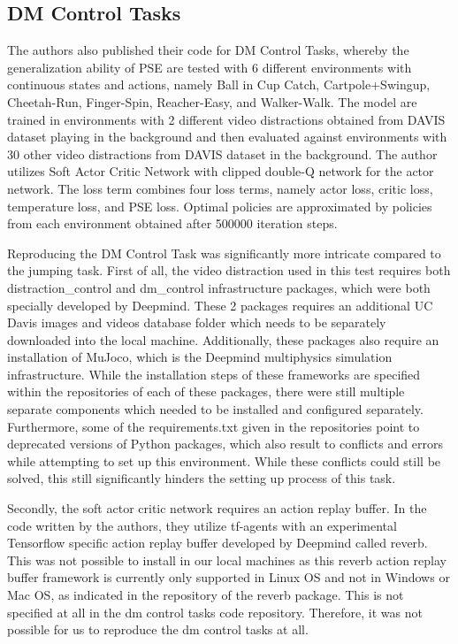 \documentclass{usiinftr}
\begin{document}
\subsection{DM Control Tasks}
The authors also published their code for DM Control Tasks, whereby the generalization ability of PSE are tested with 6 different environments with continuous states and actions, namely Ball in Cup Catch, Cartpole+Swingup, Cheetah-Run, Finger-Spin, Reacher-Easy, and Walker-Walk. The model are trained in environments with 2 different video distractions obtained from DAVIS dataset playing in the background and then evaluated against environments with 30 other video distractions from DAVIS dataset in the background. The author utilizes Soft Actor Critic Network with clipped double-Q network for the actor network. The loss term combines four loss terms, namely actor loss, critic loss, temperature loss, and PSE loss. Optimal policies are approximated by policies from each environment obtained after 500000 iteration steps. 

Reproducing the DM Control Task was significantly more intricate compared to the jumping task. First of all, the video distraction used in this test requires both distraction\_control and dm\_control infrastructure packages, which were both specially developed by Deepmind. These 2 packages requires an additional UC Davis images and videos database folder which needs to be separately downloaded into the local machine. Additionally, these packages also require an installation of MuJoco, which is the Deepmind multiphysics simulation infrastructure. While the installation steps of these frameworks are specified within the repositories of each of these packages, there were still multiple separate components which needed to be installed and configured separately. Furthermore, some of the requirements.txt given in the repositories point to deprecated versions of Python packages, which also result to conflicts and errors while attempting to set up this environment. While these conflicts could still be solved, this still significantly hinders the setting up process of this task. 

Secondly, the soft actor critic network requires an action replay buffer. In the code written by the authors, they utilize tf-agents with an experimental Tensorflow specific action replay buffer developed by Deepmind called reverb. This was not possible to install in our local machines as this reverb action replay buffer framework is currently only supported in Linux OS and not in Windows or Mac OS, as indicated in the repository of the reverb package. This is not specified at all in the dm control tasks code repository. Therefore, it was not possible for us to reproduce the dm control tasks at all.  
\end{document}
